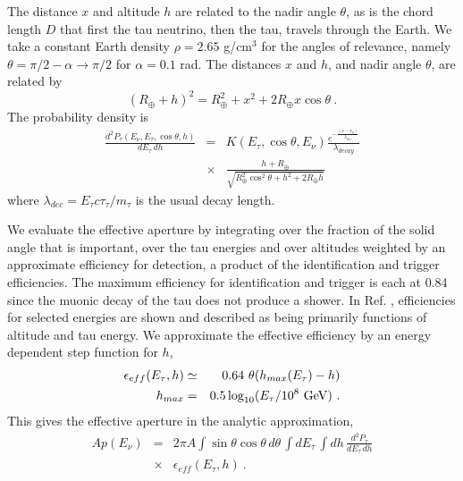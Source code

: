 \documentclass[aps,10pt,twocolumn,tightenlines]{revtex4-1}
\begin{document}
The distance $x$ and altitude $h$ are related to the nadir angle $\theta$, as is the  chord length $D$ that first the
tau neutrino, then the tau, travels through the Earth. We take a constant Earth density $\rho=2.65$ g/cm$^3$
 for the angles of relevance,
namely $\theta=\pi/2-\alpha\to \pi/2$ for $\alpha=0.1$ rad. The distances $x$ and $h$, and nadir angle $\theta$, are related by
\begin{equation}
(R_\oplus+h)^2 = R_\oplus^2+x^2+2 R_\oplus x\cos\theta \ .
\end{equation}
The probability density is
\begin{eqnarray*}
\frac{d^2 P_\tau(E_\nu,E_\tau,\cos\theta,h)}{dE_\tau \, dh} 
&=& K(E_\tau,\cos\theta,E_\nu)\frac{e^{-\frac{(x-x_0)}{\lambda_{dec}}}}{\lambda_{decay}}\\
&\times & \frac{h+R_\oplus}{\sqrt{R_\oplus^2\cos^2\theta + h^2+2R_\oplus h}}
\end{eqnarray*}
where $\lambda_{dec} = E_\tau c\tau_\tau/m_\tau$ is the usual decay length. 

We evaluate the effective aperture by integrating over the fraction of the solid angle that is important, over the tau energies
and over altitudes weighted by an approximate efficiency for detection, a product of the identification and trigger efficiencies. 
The maximum efficiency for identification and trigger is each at 0.84 since the muonic decay of the tau does not produce a shower. In Ref. \cite{Abraham:2009uy}, efficiencies for selected energies are shown and described as being primarily functions of altitude and tau energy. We approximate the effective efficiency by an energy dependent step function for $h$,
\begin{eqnarray*}
\epsilon_{eff}(E_\tau, h)&\simeq & 0.64\ \theta(h_{max}(E_\tau)-h)\\
h_{max} &=& 0.5\log_{10}(E_\tau/10^8\ {\rm GeV}) \ .
\end{eqnarray*}
This gives the effective aperture in the analytic approximation,
\begin{eqnarray*}
Ap(E_\nu) &=& 2\pi A  \int \sin\theta\cos\theta\, d\theta\, \int dE_\tau\, \int dh \, \frac{d^2 P_\tau}{dE_\tau \, dh} \\
&\times & \epsilon_{eff}(E_\tau, h)\ .
\end{eqnarray*}
\end{document}
